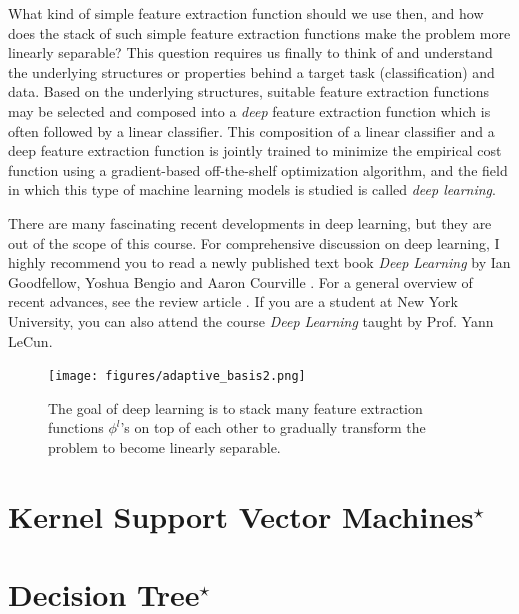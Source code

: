 \documentclass{report}
\begin{document}
What kind of simple feature extraction function should we use then, and how does
the stack of such simple feature extraction functions make the problem more
linearly separable? This question requires us finally to think of and understand
the underlying structures or properties behind a target task (classification)
and data. Based on the underlying structures, suitable feature extraction
functions may be selected and composed into a {\it deep} feature extraction
function which is often followed by a linear classifier. This composition of a
linear classifier and a deep feature extraction function is jointly trained to
minimize the empirical cost function using a gradient-based off-the-shelf
optimization algorithm, and the field in which this type of machine learning
models is studied is called {\it deep learning}. 

There are many fascinating recent developments in deep learning, but they are
out of the scope of this course. For comprehensive discussion on deep learning,
I highly recommend you to read a newly published text book {\it Deep Learning}
by Ian Goodfellow, Yoshua Bengio and Aaron Courville \cite{goodfellow2016deep}.
For a general overview of recent advances, see the review article
\cite{lecun2015deep}. If you are a student at New York University, you can also
attend the course {\it Deep Learning} taught by Prof. Yann LeCun.



\begin{figure}
    \centering
    \begin{minipage}{0.6\textwidth}
        \centering
        \texttt{[image: figures/adaptive\_basis2.png]}
    \end{minipage}
    \begin{minipage}{0.39\textwidth}
        \caption{
            \label{fig:feature_extraction_deep}
            The goal of deep learning is to stack many feature extraction
            functions $\phi^l$'s on top of each other to gradually transform the
            problem to become linearly separable. 
        }
    \end{minipage}
\end{figure}



\section{Kernel Support Vector Machines$^\star$}

\section{Decision Tree$^\star$}
\end{document}
